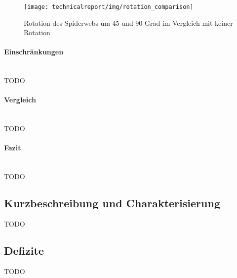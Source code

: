 \begin{figure}[th]
\centering
\texttt{[image: technicalreport/img/rotation\_comparison]}
\caption[SpiderWeb-Graph Vergleich mit Rotation]{Rotation des Spiderwebs um 45 und 90 Grad im Vergleich mit keiner Rotation}
\label{fig:rotation_comparison}
\end{figure}


\paragraph{Einschränkungen}~\\

TODO

\paragraph{Vergleich}~\\

TODO

\paragraph{Fazit}~\\

TODO

\subsection{Kurzbeschreibung und Charakterisierung}
\label{sub:Kurzbeschreibung und Charakterisierung}
TODO

\subsection{Defizite}
\label{sub:Defizite}
TODO

